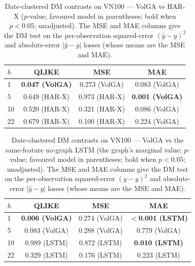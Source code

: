 \documentclass{llncs}
\begin{document}
\begin{table}[t]
\centering
\caption{Date-clustered DM contrasts on VN100 --- VolGA vs HAR-X ($p$-value; favoured model in
parentheses; bold when $p<0.05$; unadjusted).
The MSE and MAE columns give the DM test on the per-observation squared-error $(\hat{y}-y)^2$ and absolute-error $|\hat{y}-y|$ losses (whose means are the MSE and MAE).}
\label{tab:dm-vn100-harx}
\footnotesize
\setlength{\tabcolsep}{8pt}
\begin{tabular}{lccc}
\toprule
$h$ & QLIKE & MSE & MAE \\
\midrule
1 & \textbf{0.047 (VolGA)} & 0.273 (VolGA) & 0.083 (VolGA) \\
5 & 0.649 (HAR-X) & 0.973 (HAR-X) & \textbf{0.001 (VolGA)} \\
10 & 0.520 (HAR-X) & 0.321 (HAR-X) & 0.086 (VolGA) \\
22 & 0.679 (HAR-X) & 0.100 (HAR-X) & 0.224 (VolGA) \\
\bottomrule
\end{tabular}
\end{table}

\begin{table}[t]
\centering
\caption{Date-clustered DM contrasts on VN100 --- VolGA vs the same-feature no-graph LSTM (the graph's
marginal value; $p$-value; favoured model in parentheses; bold when $p<0.05$; unadjusted). The MSE and MAE columns give the DM test on the per-observation squared-error $(\hat{y}-y)^2$ and absolute-error $|\hat{y}-y|$ losses (whose means are the MSE and MAE).}
\label{tab:dm-vn100-lstm}
\footnotesize
\setlength{\tabcolsep}{8pt}
\begin{tabular}{lccc}
\toprule
$h$ & QLIKE & MSE & MAE \\
\midrule
1 & \textbf{0.006 (VolGA)} & 0.274 (VolGA) & \textbf{$<$0.001 (LSTM)} \\
5 & 0.083 (VolGA) & 0.288 (VolGA) & 0.779 (VolGA) \\
10 & 0.989 (LSTM) & 0.872 (LSTM) & \textbf{0.010 (LSTM)} \\
22 & 0.329 (LSTM) & 0.176 (LSTM) & 0.223 (LSTM) \\
\bottomrule
\end{tabular}
\end{table}
\end{document}
